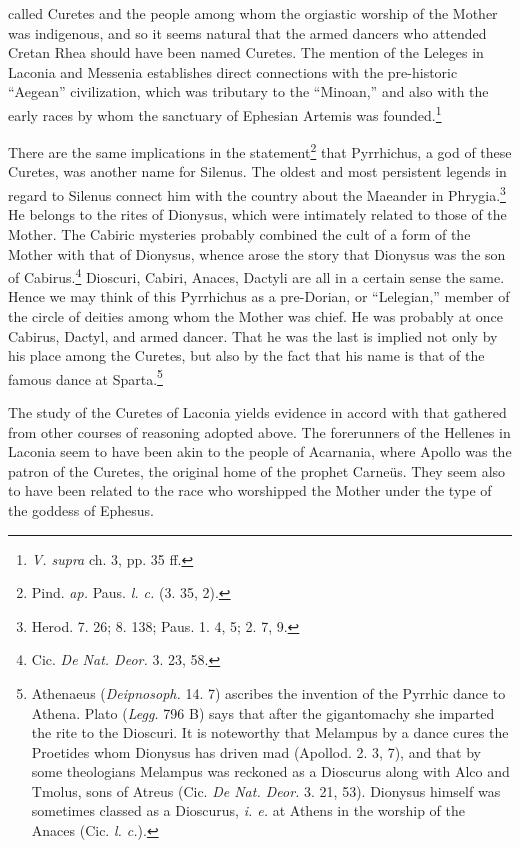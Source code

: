 \documentclass[a4paper, 12pt, oneside]{article}
\begin{document}
called Curetes and the people among whom the orgiastic worship of the Mother was indigenous, and so it seems natural that the armed dancers who attended Cretan Rhea should have been named Curetes. The mention of the Leleges in Laconia and Messenia establishes direct connections with the pre-historic ``Aegean'' civilization, which was tributary to the ``Minoan,'' and also with the early races by whom the sanctuary of Ephesian Artemis was founded.\footnote{\emph{V. supra} ch. 3, pp. 35 ff.}

There are the same implications in the statement\footnote{Pind. \emph{ap.} Paus. \emph{l. c.} (3. 35, 2).} that Pyrrhichus, a god of these Curetes, was another name for Silenus. The oldest and most persistent legends in regard to Silenus connect him with the country about the Maeander in Phrygia.\footnote{Herod. 7. 26; 8. 138; Paus. 1. 4, 5; 2. 7, 9.} He belongs to the rites of Dionysus, which were intimately related to those of the Mother. The Cabiric mysteries probably combined the cult of a form of the Mother with that of Dionysus, whence arose the story that Dionysus was the son of Cabirus.\footnote{Cic. \emph{De Nat. Deor.} 3. 23, 58.} Dioscuri, Cabiri, Anaces, Dactyli are all in a certain sense the same. Hence we may think of this Pyrrhichus as a pre-Dorian, or ``Lelegian,'' member of the circle of deities among whom the Mother was chief. He was probably at once Cabirus, Dactyl, and armed dancer. That he was the last is implied not only by his place among the Curetes, but also by the fact that his name is that of the famous dance at Sparta.\footnote{Athenaeus (\emph{Deipnosoph.} 14. 7) ascribes the invention of the Pyrrhic dance to Athena. Plato (\emph{Legg.} 796 B) says that after the gigantomachy she imparted the rite to the Dioscuri. It is noteworthy that Melampus by a dance cures the Proetides whom Dionysus has driven mad (Apollod. 2. 3, 7), and that by some theologians Melampus was reckoned as a Dioscurus along with Alco and Tmolus, sons of Atreus (Cic. \emph{De Nat. Deor.} 3. 21, 53). Dionysus himself was sometimes classed as a Dioscurus, \emph{i. e.} at Athens in the worship of the Anaces (Cic. \emph{l. c.}).}

The study of the Curetes of Laconia yields evidence in accord with that gathered from other courses of reasoning adopted above. The forerunners of the Hellenes in Laconia seem to have been akin to the people of Acarnania, where Apollo was the patron of the Curetes, the original home of the prophet Carneüs. They seem also to have been related to the race who worshipped the Mother under the type of the goddess of Ephesus.
\end{document}

